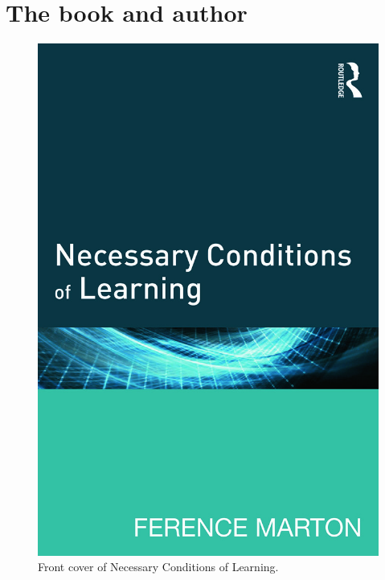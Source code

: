 \mode*

\section[Book and author]{The book and author}

\begin{frame}
  \begin{figure}
    \includegraphics[height=0.8\textheight]{fig/book.jpg}
    \caption{Front cover of Necessary Conditions of Learning.}
  \end{figure}
\end{frame}

